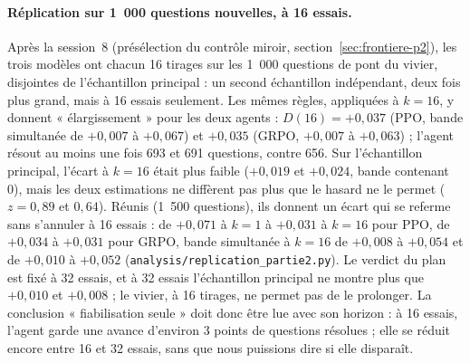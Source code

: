 \documentclass[11pt,a4paper]{article}
\begin{document}
\paragraph{Réplication sur 1~000 questions nouvelles, à 16 essais.} Après la session~8 (présélection du contrôle miroir, section~\ref{sec:frontiere-p2}), les trois modèles ont chacun 16 tirages sur les 1~000 questions de pont du vivier, disjointes de l'échantillon principal : un second échantillon indépendant, deux fois plus grand, mais à 16 essais seulement. Les mêmes règles, appliquées à $k = 16$, y donnent « élargissement » pour les deux agents : $D(16) = +0{,}037$ (PPO, bande simultanée de $+0{,}007$ à $+0{,}067$) et $+0{,}035$ (GRPO, $+0{,}007$ à $+0{,}063$) ; l'agent résout au moins une fois 693 et 691 questions, contre 656. Sur l'échantillon principal, l'écart à $k = 16$ était plus faible ($+0{,}019$ et $+0{,}024$, bande contenant 0), mais les deux estimations ne diffèrent pas plus que le hasard ne le permet ($z = 0{,}89$ et $0{,}64$). Réunis (1~500 questions), ils donnent un écart qui se referme sans s'annuler à 16 essais : de $+0{,}071$ à $k = 1$ à $+0{,}031$ à $k = 16$ pour PPO, de $+0{,}034$ à $+0{,}031$ pour GRPO, bande simultanée à $k = 16$ de $+0{,}008$ à $+0{,}054$ et de $+0{,}010$ à $+0{,}052$ (\texttt{analysis/replication\_partie2.py}). Le verdict du plan est fixé à 32 essais, et à 32 essais l'échantillon principal ne montre plus que $+0{,}010$ et $+0{,}008$ ; le vivier, à 16 tirages, ne permet pas de le prolonger. La conclusion « fiabilisation seule » doit donc être lue avec son horizon : à 16 essais, l'agent garde une avance d'environ 3 points de questions résolues ; elle se réduit encore entre 16 et 32 essais, sans que nous puissions dire si elle disparaît.
\end{document}
